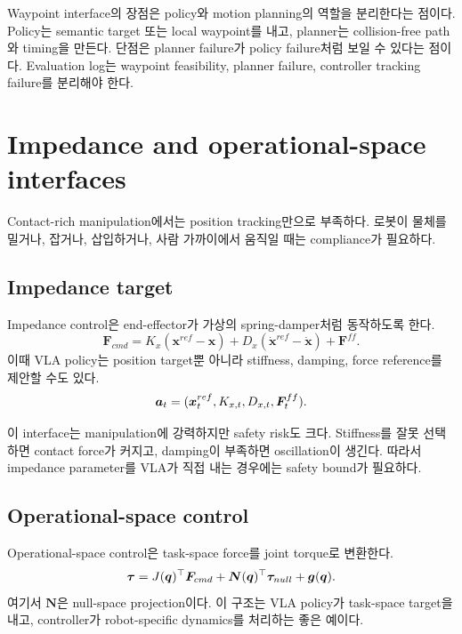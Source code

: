 Waypoint interface의 장점은 policy와 motion planning의 역할을 분리한다는 점이다. Policy는 semantic target 또는 local waypoint를 내고, planner는 collision-free path와 timing을 만든다. 단점은 planner failure가 policy failure처럼 보일 수 있다는 점이다. Evaluation log는 waypoint feasibility, planner failure, controller tracking failure를 분리해야 한다.

\section{Impedance and operational-space interfaces}

Contact-rich manipulation에서는 position tracking만으로 부족하다. 로봇이 물체를 밀거나, 잡거나, 삽입하거나, 사람 가까이에서 움직일 때는 compliance가 필요하다.

\subsection{Impedance target}

Impedance control은 end-effector가 가상의 spring-damper처럼 동작하도록 한다.
\begin{equation}
  \bm{F}_{cmd}
  =
  K_x(\bm{x}^{ref}-\bm{x})
  +D_x(\dot{\bm{x}}^{ref}-\dot{\bm{x}})
  +\bm{F}^{ff}.
  \label{eq:impedance}
\end{equation}
이때 VLA policy는 position target뿐 아니라 stiffness, damping, force reference를 제안할 수도 있다.
\begin{equation}
  \bm{a}_t = (\bm{x}^{ref}_t, K_{x,t}, D_{x,t}, \bm{F}^{ff}_t).
  \label{eq:impedance-action}
\end{equation}

이 interface는 manipulation에 강력하지만 safety risk도 크다. Stiffness를 잘못 선택하면 contact force가 커지고, damping이 부족하면 oscillation이 생긴다. 따라서 impedance parameter를 VLA가 직접 내는 경우에는 safety bound가 필요하다.

\subsection{Operational-space control}

Operational-space control은 task-space force를 joint torque로 변환한다.
\begin{equation}
  \bm{\tau}
  =
  J(\bm{q})^\top \bm{F}_{cmd}
  + \bm{N}(\bm{q})^\top \bm{\tau}_{null}
  + \bm{g}(\bm{q}).
  \label{eq:osc}
\end{equation}
여기서 $\bm{N}$은 null-space projection이다. 이 구조는 VLA policy가 task-space target을 내고, controller가 robot-specific dynamics를 처리하는 좋은 예이다.

